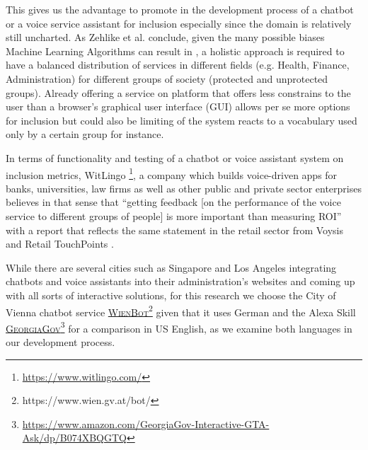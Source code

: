 This gives us the advantage to promote in the development process of a chatbot or a voice service assistant for inclusion especially since the domain is relatively still uncharted. As Zehlike et al. conclude, given the many possible biases Machine Learning Algorithms can result in \cite{fa:ir}, a holistic approach is required to have a balanced distribution of services in different fields (e.g. Health, Finance, Administration) for different groups of society (protected and unprotected groups).
Already offering a service on platform that offers less constrains to the user than a browser's graphical user interface (GUI) allows per se more options for inclusion but could also be limiting of the system reacts to a vocabulary used only by a certain group for instance.

In terms of functionality and testing of a chatbot or voice assistant system on inclusion metrics, WitLingo \footnote{\url{https://www.witlingo.com/}}, a company which builds voice-driven apps for banks, universities, law firms as well as other public and private sector enterprises believes in that sense that ``getting feedback [on the performance of the voice service to different groups of people] is more important than measuring ROI'' \cite{witlingo:bouzid} with a report that reflects the same statement in the retail sector from Voysis and Retail TouchPoints \cite{voysis:report}.



%


	While there are several cities such as Singapore and Los Angeles integrating chatbots and voice assistants into their administration's websites and coming up with all sorts of interactive solutions,
	for this research we choose the City of Vienna chatbot service \href{https://www.wien.gv.at/bot/}{\textsc{WienBot}\footnote{\url{https://www.wien.gv.at/bot/}}} given that it uses German 
	and the Alexa Skill \href{https://www.amazon.com/GeorgiaGov-Interactive-GTA-Ask/dp/B074XBQGTQ}{\textsc{GeorgiaGov}}\footnote{\url{https://www.amazon.com/GeorgiaGov-Interactive-GTA-Ask/dp/B074XBQGTQ}} for a comparison in US English, as we examine both languages in our development process.

